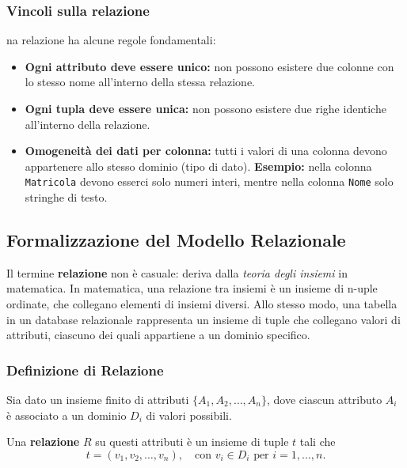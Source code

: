 \documentclass[a4paper,12pt]{article}
\begin{document}
\subsubsection*{Vincoli sulla relazione}
na relazione ha alcune regole fondamentali:

\begin{itemize}
    \item \textbf{Ogni attributo deve essere unico:} non possono esistere due colonne con lo stesso nome all'interno della stessa relazione.
    \item \textbf{Ogni tupla deve essere unica:} non possono esistere due righe identiche all'interno della relazione.
    \item \textbf{Omogeneità dei dati per colonna:} tutti i valori di una colonna devono appartenere allo stesso dominio (tipo di dato).  
    \textbf{Esempio:} nella colonna \texttt{Matricola} devono esserci solo numeri interi, mentre nella colonna \texttt{Nome} solo stringhe di testo.
\end{itemize}

\subsection{Formalizzazione del Modello Relazionale}
Il termine \textbf{relazione} non è casuale: deriva dalla \textit{teoria degli insiemi} in matematica.  
In matematica, una relazione tra insiemi è un insieme di n-uple ordinate, che collegano elementi di insiemi diversi.  
Allo stesso modo, una tabella in un database relazionale rappresenta un insieme di tuple che collegano valori di attributi, ciascuno dei quali appartiene a un dominio specifico.

\subsubsection{Definizione di Relazione}

Sia dato un insieme finito di attributi \( \{A_1, A_2, \dots, A_n\} \), 
dove ciascun attributo \(A_i\) è associato a un dominio \(D_i\) di valori possibili.


\vspace{0.5cm}

Una \textbf{relazione} \(R\) su questi attributi è un insieme di tuple \(t\) tali che
\[
t = (v_1, v_2, \dots, v_n), \quad \text{con } v_i \in D_i \text{ per } i=1,\dots,n.
\]

\vspace{0.2cm}
\end{document}
